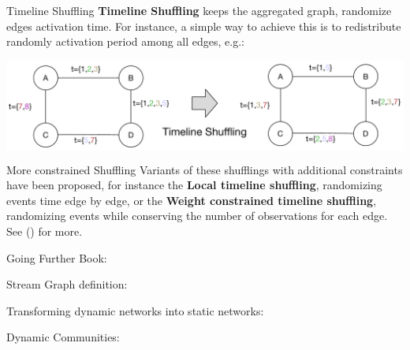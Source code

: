 \documentclass[a4paper,11pt]{book}
\begin{document}
\begin{textbox}{Timeline Shuffling}
\textbf{Timeline Shuffling} keeps the aggregated graph, randomize edges activation time. For instance, a simple way to achieve this is to redistribute randomly activation period among all edges, e.g.: 
   
 
 
\centering

\colorbox{white}{\includegraphics[width=0.9\linewidth]{pics/dynamic/timeline-shuffling.pdf}}
 
\end{textbox}

\begin{textbox}{More constrained Shuffling}
Variants of these shufflings with additional constraints have been proposed, for instance the \textbf{Local timeline shuffling}, randomizing events time edge by edge, or the \textbf{Weight constrained timeline shuffling}, randomizing events while conserving the number of observations for each edge. See (\cite{gauvin2018randomized}) for more.
 
 
\centering

 
\end{textbox}


\begin{textbox}{Going Further}
Book: \cite{holme2019temporal}

Stream Graph definition: \cite{latapy2018stream}

Transforming dynamic networks into static networks:  \cite{kivela2018mapping}

Dynamic Communities: \cite{rossetti2018community}

\end{textbox}

\end{document}
